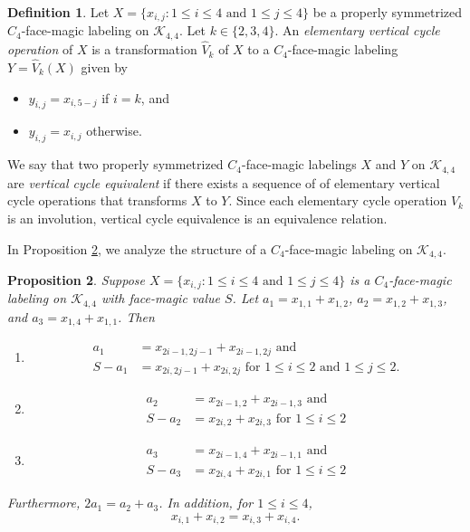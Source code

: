 \documentclass[10pt, reqno]{amsart}
\theoremstyle{definition}
\newtheorem{definition}{Definition}
\theoremstyle{plain}
\newtheorem{proposition}[definition]{Proposition}
\begin{document}
\begin{definition}\label{defn:ElemOperns}
     Let  $X=\{x_{i,j}: 1\le i \le 4 \text{ and } 
   1\le j \le 4\}$ be a 
   properly symmetrized $C_4$-face-magic labeling 
   on  $\mathcal{K}_{4,4}$. 
   Let $k\in\{2,3,4\}$.
   An \textit{elementary vertical cycle operation}
   of $X$ is a transformation $\widehat{V}_k$
   of $X$ to a $C_4$-face-magic labeling
   $Y=\widehat{V}_k(X)$ given by
   \begin{itemize}
       \item $y_{i,j}=x_{i,5-j}$ if $i=k$, and 
       \item $y_{i,j}=x_{i,j}$ otherwise.
   \end{itemize}

   We say that two properly
   symmetrized $C_4$-face-magic labelings $X$ and $Y$
   on $\mathcal{K}_{4,4}$
   are \textit{vertical cycle equivalent} if
   there exists a sequence of of elementary 
  vertical cycle 
   operations that transforms $X$ to $Y$.
   Since each elementary cycle operation $\widehat{V}_k$
   is an involution, vertical cycle equivalence 
   is an equivalence relation.
\end{definition}

In Proposition \ref{prop:extendedgesums}, we analyze 
the structure 
of a $C_4$-face-magic labeling on $\mathcal{K}_{4,4}$.

\begin{proposition}\label{prop:extendedgesums}
Suppose  $X=\{x_{i,j}: 1\le i \le 4 \text{ and } 
   1\le j \le 4\}$ is a $C_4$-face-magic labeling
   on $\mathcal{K}_{4,4}$ with face-magic value $S$.
   Let $a_1= x_{1,1} + x_{1,2}$,
    $a_2= x_{1,2} + x_{1,3}$, and
     $a_3= x_{1,4} + x_{1,1}$.
        Then
\begin{enumerate}
\item[(i)]
\begin{align*}
   a_1 &= x_{2i-1,2j-1} + x_{2i-1,2j} 
    \text{ \ \  and } \\
  S - a_1 &=  x_{2i,2j-1} + x_{2i,2j} 
    \text{ \ \ \ \ \ \ \ \ for } 1\le i \le 2 
    \text{ and } 1 \le j \le 2.
\end{align*}
\item[(ii)]
\begin{align*}
    a_2 & = x_{2i-1, 2} + x_{2i-1, 3}
    \text{ \ \  and } \\
    S - a_2 & = x_{2i, 2} + x_{2i,3}
    \text{ \ \ \ \ \ \ \ \ for } 1\le i \le 2
\end{align*}
\item[(iii)]
\begin{align*}
    a_3 & = x_{2i-1, 4} + x_{2i-1, 1}
    \text{ \ \  and } \\
    S - a_3 & = x_{2i, 4} + x_{2i,1}
    \text{ \ \ \ \ \ \ \ \ for } 1\le i \le 2
\end{align*}
\end{enumerate}
Furthermore, $2a_1 = a_2 + a_3$. In addition, for $1\le i \le 4$,
\begin{equation} \label{eqn:SameEdgeSum}
    x_{i,1} + x_{i,2} = x_{i,3} + x_{i,4}.
\end{equation}
\end{proposition}
\end{document}
